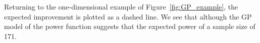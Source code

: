 \documentclass{article} %
\begin{document}
Returning to the one-dimensional example of Figure~\ref{fig:GP_example}, the expected improvement is plotted as a dashed line. We see that although the GP model of the power function suggests that the expected power of a sample size of 171.

%
%
\end{document}
